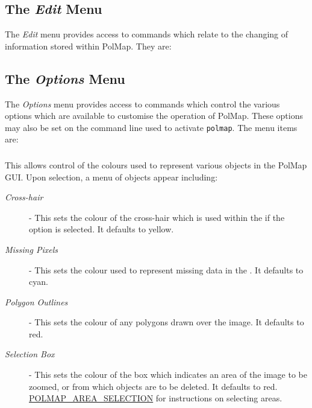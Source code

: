 \subsubsection {} 

\subsection {The {\em Edit} Menu}
The {\em Edit} menu provides access to commands which relate to
the changing of information stored within PolMap. They are:

\subsection {The {\em Options} Menu}
The {\em Options} menu provides access to commands which control the
various options which are available to customise the operation of PolMap.
These options may also be set on the command line used to activate 
{\tt polmap}. The menu items are:

\subsubsection {} 
This allows control of the colours used to represent various objects in
the PolMap GUI. Upon selection, a menu of objects appear including:

\begin{description}

\item [{\em Cross-hair}] - This sets the colour of the cross-hair which
is used within the  if
the  option is
selected. It defaults to yellow.

\item [{\em Missing Pixels}] -  This sets the colour used to represent
missing data in the .
It defaults to cyan.

\item [{\em Polygon Outlines}] - This sets the colour of any polygons drawn
over the image. It defaults to red.

\item [{\em Selection Box}] - This sets the colour of the box
which indicates an area of the image to be zoomed, or from which objects
are to be deleted. It defaults to red. \hyperref{Go here}{See
section }{}{POLMAP_AREA_SELECTION} for instructions on selecting areas.

\end{description}

